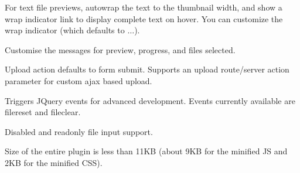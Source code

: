 \begin{DoxyItemize}
\item For text file previews, autowrap the text to the thumbnail width, and show a wrap indicator link to display complete text on hover. You can customize the wrap indicator (which defaults to {$\dots$}).
\item Customise the messages for preview, progress, and files selected.
\item Upload action defaults to form submit. Supports an upload route/server action parameter for custom ajax based upload.
\item Triggers J\+Query events for advanced development. Events currently available are {\ttfamily filereset} and {\ttfamily fileclear}.
\item Disabled and readonly file input support.
\item Size of the entire plugin is less than 11\+KB (about 9\+KB for the minified JS and 2\+KB for the minified C\+SS). 
\end{DoxyItemize}